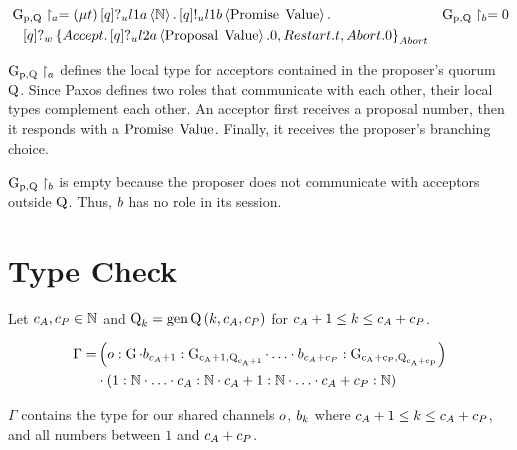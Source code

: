 \begin{align*}
&\operatorname{G_{p, \operatorname{Q}}} \upharpoonright_{a} =
    \left(\mu t\right)
    \left[q\right]?_u l1a \left\langle \mathbb{N} \right\rangle .
    \left[q\right]!_u l1b \left\langle \operatorname{Promise}\; \operatorname{Value} \right\rangle .
&\operatorname{G_{p, \operatorname{Q}}} \upharpoonright_{b} = 0\\
&\hspace*{0.75em * 1}
    \left[q\right]?_w \left\{
        \mathnormal{Accept} .
            \left[q\right]?_u l2a \left\langle \operatorname{Proposal}\; \operatorname{Value} \right\rangle.
            0
        ,\mathnormal{Restart} .
            t
        ,\mathnormal{Abort} .
            0
    \right\}_{\mathnormal{Abort}}
\end{align*}

$\operatorname{G_{p, \operatorname{Q}}} \upharpoonright_{a}$ defines the local type for acceptors contained in the proposer's quorum $\operatorname{Q}$.
Since Paxos defines two roles that communicate with each other, their local types complement each other.
An acceptor first receives a proposal number, then it responds with a $\operatorname{Promise}\; \operatorname{Value}$.
Finally, it receives the proposer's branching choice.

$\operatorname{G_{p, \operatorname{Q}}} \upharpoonright_{b}$ is empty because the proposer does not communicate with acceptors outside $\operatorname{Q}$.
Thus, $b$ has no role in its session.

\section{Type Check}
Let $c_A,c_P\in\mathbb{N}$ and $\operatorname{Q}_{k} = \operatorname{gen\operatorname{Q}}\left(k, c_A, c_P\right)$ for $c_A + 1 \leq k \leq c_A + c_P$.

\begin{align*}
\Gamma =
    &\left(
    o:\operatorname{G}
    \cdot b_{c_A+1}:\operatorname{G_{c_A+1, \operatorname{Q}_{c_A+1}}} \cdot \ldots
    \cdot b_{c_A+c_P}:\operatorname{G_{c_A+c_P, \operatorname{Q}_{c_A+c_P}}}
    \right)\\
&\cdot
    \left(
    1:\mathbb{N}
    \cdot \ldots
    \cdot c_A:\mathbb{N}
    \cdot c_A + 1:\mathbb{N}
    \cdot \ldots
    \cdot c_A + c_P:\mathbb{N}
    \right)
\end{align*}

$\Gamma$ contains the type for our shared channels $o$, $b_{k}$ where $c_A + 1 \leq k \leq c_A + c_P$, and all numbers between $1$ and $c_A + c_P$.


